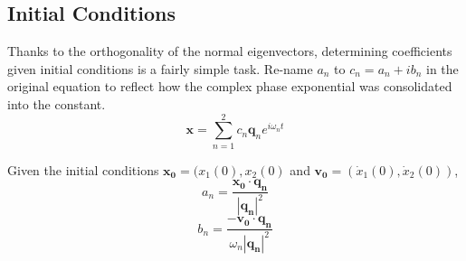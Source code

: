 \documentclass[11pt]{article}
\begin{document}
\subsection{Initial Conditions}
	Thanks to the orthogonality of the normal eigenvectors, determining coefficients given initial conditions is a fairly simple task. Re-name $a_n$ to $c_n = a_n + ib_n$ in the original equation to reflect how the complex phase exponential was consolidated into the constant.
	\begin{equation}
		\mathbf{x} = \sum_{n=1}^2 c_n \mathbf{q}_n e^{i\omega_n t}
	\end{equation}
	
	Given the initial conditions $\mathbf{x_0} = (x_1(0), x_2(0)$ and $\mathbf{v_0} = (\dot{x}_1(0), \dot{x}_2(0))$, 
	\begin{equation}
		a_n = \frac{\mathbf{x_0} \cdot \mathbf{q_n}}{|\mathbf{q_n}|^2}
	\end{equation}
	\begin{equation}
		b_n = \frac{-\mathbf{v_0} \cdot \mathbf{q_n}}{\omega_n |\mathbf{q_n}|^2}
	\end{equation}

%	
%	


\end{document}
